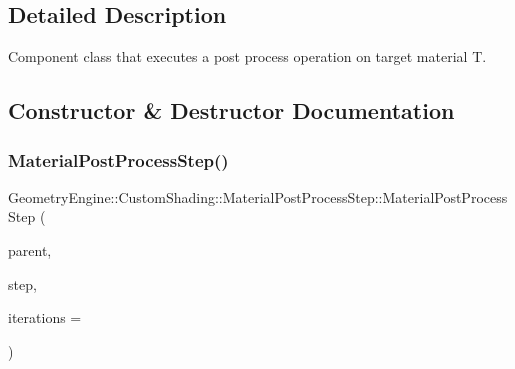 \subsection{Detailed Description}
Component class that executes a post process operation on target material T. 

\subsection{Constructor \& Destructor Documentation}
\mbox{\label{class_geometry_engine_1_1_custom_shading_1_1_material_post_process_step_a58a79c5f61a28a04535e0e4527899d1c}} 
\subsubsection{\texorpdfstring{MaterialPostProcessStep()}{MaterialPostProcessStep()}\hspace{0.1cm}{\footnotesize\ttfamily [1/2]}}
{\footnotesize\ttfamily Geometry\+Engine\+::\+Custom\+Shading\+::\+Material\+Post\+Process\+Step\+::\+Material\+Post\+Process\+Step (\begin{DoxyParamCaption}\item[{\mbox{\hyperlink{class_geometry_engine_1_1_custom_shading_1_1_material_post_process_interface}{Material\+Post\+Process\+Interface}} $\ast$}]{parent,  }\item[{\mbox{\hyperlink{namespace_geometry_engine_1_1_custom_shading_af8b09b91ca7086f4f67a5d4181f35e58}{Material\+Post\+Process\+Steps}}}]{step,  }\item[{unsigned int}]{iterations = {} }\end{DoxyParamCaption})}

